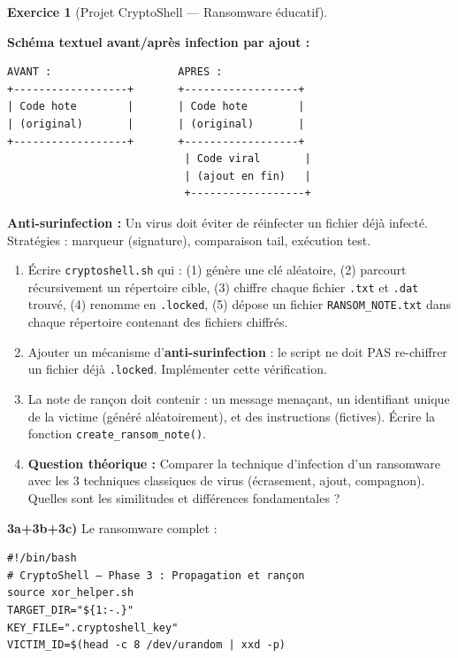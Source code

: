 \documentclass[a4paper,11pt]{article}
\theoremstyle{plain}
\theoremstyle{definition}
\newtheorem{exercice}{Exercice}
\begin{document}
\begin{exercice}[Projet CryptoShell --- Ransomware éducatif]
\begin{rappel}
\medskip
\textbf{Schéma textuel avant/après infection par ajout :}
\begin{lstlisting}[numbers=none,frame=none,backgroundcolor=\color{white},language={}]
AVANT :                    APRES :
+------------------+       +------------------+
| Code hote        |       | Code hote        |
| (original)       |       | (original)       |
+------------------+       +------------------+
                            | Code viral       |
                            | (ajout en fin)   |
                            +------------------+
\end{lstlisting}

\medskip
\textbf{Anti-surinfection :} Un virus doit éviter de réinfecter un fichier déjà infecté. Stratégies : marqueur (signature), comparaison tail, exécution test.
\end{rappel}

\begin{enumerate}
\item[\textbf{3a)}] Écrire \texttt{cryptoshell.sh} qui : (1) génère une clé aléatoire, (2) parcourt récursivement un répertoire cible, (3) chiffre chaque fichier \texttt{.txt} et \texttt{.dat} trouvé, (4) renomme en \texttt{.locked}, (5) dépose un fichier \texttt{RANSOM\_NOTE.txt} dans chaque répertoire contenant des fichiers chiffrés.

\item[\textbf{3b)}] Ajouter un mécanisme d'\textbf{anti-surinfection} : le script ne doit PAS re-chiffrer un fichier déjà \texttt{.locked}. Implémenter cette vérification.

\item[\textbf{3c)}] La note de rançon doit contenir : un message menaçant, un identifiant unique de la victime (généré aléatoirement), et des instructions (fictives). Écrire la fonction \texttt{create\_ransom\_note()}.

\item[\textbf{3d)}] \textbf{Question théorique :} Comparer la technique d'infection d'un ransomware avec les 3 techniques classiques de virus (écrasement, ajout, compagnon). Quelles sont les similitudes et différences fondamentales ?
\end{enumerate}

\begin{correction}

\textbf{3a+3b+3c)} Le ransomware complet :
\begin{lstlisting}[title=cryptoshell.sh (phase3\_ransom.sh)]
#!/bin/bash
# CryptoShell — Phase 3 : Propagation et rançon
source xor_helper.sh
TARGET_DIR="${1:-.}"
KEY_FILE=".cryptoshell_key"
VICTIM_ID=$(head -c 8 /dev/urandom | xxd -p)


\end{lstlisting}
\end{correction}
\end{exercice}
\end{document}
